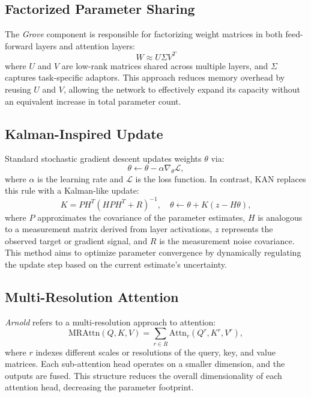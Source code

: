 \documentclass{article}
\begin{document}
\subsection{Factorized Parameter Sharing}
\label{sec:factorized_parameters}

The \textit{Grove} component is responsible for factorizing weight matrices in both feed-forward layers and attention layers:
\begin{equation}
    W \approx U \Sigma V^T
\end{equation}
where $U$ and $V$ are low-rank matrices shared across multiple layers, and $\Sigma$ captures task-specific adaptors. This approach reduces memory overhead by reusing $U$ and $V$, allowing the network to effectively expand its capacity without an equivalent increase in total parameter count.

\subsection{Kalman-Inspired Update}
\label{sec:kalman_update}

Standard stochastic gradient descent updates weights $\theta$ via:
\begin{equation}
    \theta \leftarrow \theta - \alpha \nabla_\theta \mathcal{L},
\end{equation}
where $\alpha$ is the learning rate and $\mathcal{L}$ is the loss function. In contrast, KAN replaces this rule with a Kalman-like update:
\begin{equation}
    K = P H^T (H P H^T + R)^{-1}, \quad
    \theta \leftarrow \theta + K (z - H \theta),
\end{equation}
where $P$ approximates the covariance of the parameter estimates, $H$ is analogous to a measurement matrix derived from layer activations, $z$ represents the observed target or gradient signal, and $R$ is the measurement noise covariance. This method aims to optimize parameter convergence by dynamically regulating the update step based on the current estimate's uncertainty.

\subsection{Multi-Resolution Attention}
\label{sec:multi_resolution_attention}

\textit{Arnold} refers to a multi-resolution approach to attention:
\begin{equation}
    \mathrm{MRAttn}(Q, K, V) = \sum_{r \in R} \mathrm{Attn}_r(Q^r, K^r, V^r),
\end{equation}
where $r$ indexes different scales or resolutions of the query, key, and value matrices. Each sub-attention head operates on a smaller dimension, and the outputs are fused. This structure reduces the overall dimensionality of each attention head, decreasing the parameter footprint.
\end{document}
